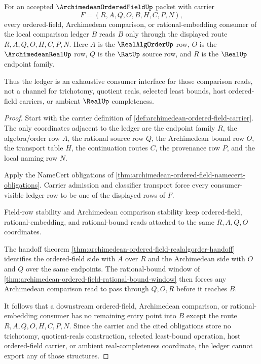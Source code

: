 \begin{theorem}
\label{thm:archimedean-ordered-field-comparison-ledger-exactness}
For an accepted $\ArchimedeanOrderedFieldUp$ packet with carrier
$$
F=(R,A,Q,O,B,H,C,P,N),
$$
every ordered-field, Archimedean comparison, or rational-embedding consumer of the local comparison ledger $B$ reads $B$ only through the displayed route $R,A,Q,O,H,C,P,N$. Here $A$ is the $\RealAlgOrderUp$ row, $O$ is the $\ArchimedeanRealUp$ row, $Q$ is the $\RatUp$ source row, and $R$ is the $\RealUp$ endpoint family.

Thus the ledger is an exhaustive consumer interface for those comparison reads, not a channel for trichotomy, quotient reals, selected least bounds, host ordered-field carriers, or ambient $\RealUp$ completeness.
\end{theorem}
\begin{proof}
Start with the carrier definition of \autoref{def:archimedean-ordered-field-carrier}. The only coordinates adjacent to the ledger are the endpoint family $R$, the algebra/order row $A$, the rational source row $Q$, the Archimedean bound row $O$, the transport table $H$, the continuation routes $C$, the provenance row $P$, and the local naming row $N$.

Apply the NameCert obligations of \autoref{thm:archimedean-ordered-field-namecert-obligations}. Carrier admission and classifier transport force every consumer-visible ledger row to be one of the displayed rows of $F$.

Field-row stability and Archimedean comparison stability keep ordered-field, rational-embedding, and rational-bound reads attached to the same $R,A,Q,O$ coordinates.

The handoff theorem \autoref{thm:archimedean-ordered-field-realalgorder-handoff} identifies the ordered-field side with $A$ over $R$ and the Archimedean side with $O$ and $Q$ over the same endpoints. The rational-bound window of \autoref{thm:archimedean-ordered-field-rational-bound-window} then forces any Archimedean comparison read to pass through $Q,O,R$ before it reaches $B$.

It follows that a downstream ordered-field, Archimedean comparison, or rational-embedding consumer has no remaining entry point into $B$ except the route $R,A,Q,O,H,C,P,N$. Since the carrier and the cited obligations store no trichotomy, quotient-reals construction, selected least-bound operation, host ordered-field carrier, or ambient real-completeness coordinate, the ledger cannot export any of those structures.
\end{proof}

